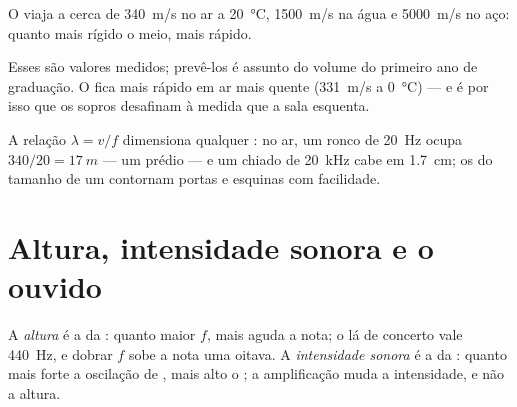 \begin{proposition}\label{prop:g12:sound-acoustics:speed}
%
O  viaja a cerca de \qty{340}{m/s} no ar a
\qty{20}{\degreeCelsius}, \qty{1500}{m/s} na água e \qty{5000}{m/s} no
aço: quanto mais rígido o meio, mais rápido. \admitted
\end{proposition}

\begin{remark}\label{rem:g12:sound-acoustics:temperature}
Esses são valores medidos; prevê-los é assunto do volume do primeiro ano
de graduação. O  fica mais rápido em ar mais quente (\qty{331}{m/s} a
\qty{0}{\degreeCelsius}) --- e é por isso que os sopros desafinam à
medida que a sala esquenta.
\end{remark}

\begin{example}\label{ex:g12:sound-acoustics:wavelengths}
A relação $\lambda = v/f$ dimensiona qualquer : no ar, um ronco de
\qty{20}{Hz} ocupa $340/20 = \qty{17}{m}$ --- um prédio --- e um chiado
de \qty{20}{kHz} cabe em \qty{1.7}{cm}; os do tamanho de um 
contornam portas e esquinas com facilidade.
\end{example}

\section{Altura, intensidade sonora e o ouvido}

\begin{definition}\label{def:g12:sound-acoustics:pitch-loudness}
A \emph{altura} é a  da :
quanto maior $f$, mais aguda a nota; o lá de concerto vale \qty{440}{Hz},
e dobrar $f$ sobe a nota uma oitava. A \emph{intensidade
sonora} é a  da :
quanto mais forte a oscilação de , mais alto o ; a amplificação
muda a intensidade, e não a altura.
\end{definition}

